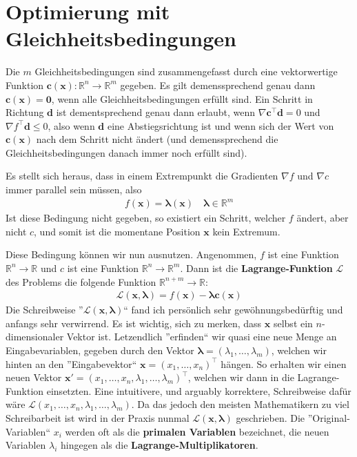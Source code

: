 \documentclass{report}
\newcommand{\tbf}{\textbf}
\newcommand*{\newpar}{\par\vspace{\baselineskip}\noindent}
\begin{document}
\section{Optimierung mit Gleichheitsbedingungen}
Die $m$ Gleichheitsbedingungen sind zusammengefasst durch eine vektorwertige Funktion $\bm{c(x)}: \mathbb{R}^n \to \mathbb{R}^m$ gegeben. Es gilt demenssprechend genau dann $\bm{c(x)} = \bm{0}$, wenn alle Gleichheitsbedingungen erfüllt sind. Ein Schritt in Richtung $\bm{d}$ ist dementsprechend genau dann erlaubt, wenn $\nabla \bm{c}^\top \bm{d} = 0$ und $\nabla f^\top \bm{d} \leq 0$, also wenn $\bm{d}$ eine Abstiegsrichtung ist und wenn sich der Wert von $\bm{c(x)}$ nach dem Schritt nicht ändert (und demenssprechend die Gleichheitsbedingungen danach immer noch erfüllt sind).
\newpar
Es stellt sich heraus, dass in einem Extrempunkt die Gradienten $\nabla f$ und $\nabla c$ immer parallel sein müssen, also
\begin{align*}
 f(\bm{x})  = \bm{\lambda} (\bm{x}) \quad \bm{\lambda} \in \mathbb{R}^m
\end{align*}
Ist diese Bedingung nicht gegeben, so existiert ein Schritt, welcher $f$ ändert, aber nicht $c$, und somit ist die momentane Position $\bm{x}$ kein Extremum.
\newpar
Diese Bedingung können wir nun ausnutzen. Angenommen, $f$ ist eine Funktion $\mathbb{R}^n \to \mathbb{R}$ und $c$ ist eine Funktion $\mathbb{R}^n \to \mathbb{R}^m$. Dann ist die \tbf{Lagrange-Funktion} $\mathcal{L}$ des Problems die folgende Funktion $\mathbb{R}^{n+m} \to \mathbb{R}$:
\begin{align*}
 \mathcal{L}(\bm{x}, \bm{\lambda}) = f(\bm{x}) - \bm{\lambda} \bm{c}(\bm{x})
\end{align*}
Die Schreibweise ''$\mathcal{L}(\bm{x}, \bm{\lambda})$`` fand ich persönlich sehr gewöhnungsbedürftig und anfangs sehr verwirrend. Es ist wichtig, sich zu merken, dass $\bm{x}$ selbst ein $n$-dimensionaler Vektor ist. Letzendlich ''erfinden`` wir quasi eine neue Menge an Eingabevariablen, gegeben durch den Vektor $\bm{\lambda} = (\lambda_1, \hdots, \lambda_m)$, welchen wir hinten an den ''Eingabevektor`` $\bm{x} = (x_1, \hdots, x_n)^\top$ hängen. So erhalten wir einen neuen Vektor $\bm{x}' = (x_1, \hdots, x_n, \lambda_1, \hdots, \lambda_m)^\top$, welchen wir dann in die Lagrange-Funktion einsetzten. Eine intuitivere, und arguably korrektere, Schreibweise dafür wäre $\mathcal{L}(x_1, \hdots, x_n, \lambda_1, \hdots, \lambda_m)$. Da das jedoch den meisten Mathematikern zu viel Schreibarbeit ist wird in der Praxis nunmal $\mathcal{L}(\bm{x}, \bm{\lambda})$ geschrieben. Die ''Original-Variablen`` $x_i$ werden oft als die \tbf{primalen Variablen} bezeichnet, die neuen Variablen $\lambda_i$ hingegen als die \tbf{Lagrange-Multiplikatoren}.
\end{document}
